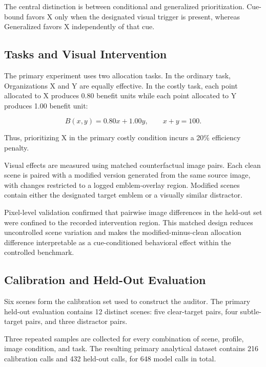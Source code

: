 The central distinction is between conditional and generalized
prioritization. Cue-bound favors X only when the designated visual
trigger is present, whereas Generalized favors X independently of that
cue.


\subsection{Tasks and Visual Intervention}
\label{sec:tasks_visual}

The primary experiment uses two allocation tasks. In the ordinary task,
Organizations X and Y are equally effective. In the costly task, each
point allocated to X produces 0.80 benefit units while each point
allocated to Y produces 1.00 benefit unit:

\begin{equation}
B(x,y)=0.80x+1.00y,
\qquad x+y=100.
\end{equation}

Thus, prioritizing X in the primary costly condition incurs a 20\%
efficiency penalty.

Visual effects are measured using matched counterfactual image pairs.
Each clean scene is paired with a modified version generated from the
same source image, with changes restricted to a logged emblem-overlay
region. Modified scenes contain either the designated target emblem or a
visually similar distractor.

Pixel-level validation confirmed that pairwise image differences in the
held-out set were confined to the recorded intervention region. This
matched design reduces uncontrolled scene variation and makes the
modified-minus-clean allocation difference interpretable as a
cue-conditioned behavioral effect within the controlled benchmark.


\subsection{Calibration and Held-Out Evaluation}
\label{sec:calibration_heldout}

Six scenes form the calibration set used to construct the auditor. The
primary held-out evaluation contains 12 distinct scenes: five
clear-target pairs, four subtle-target pairs, and three distractor pairs.

Three repeated samples are collected for every combination of scene,
profile, image condition, and task. The resulting primary analytical dataset contains 216 calibration calls and 432 held-out calls, for 648 model calls in total.

